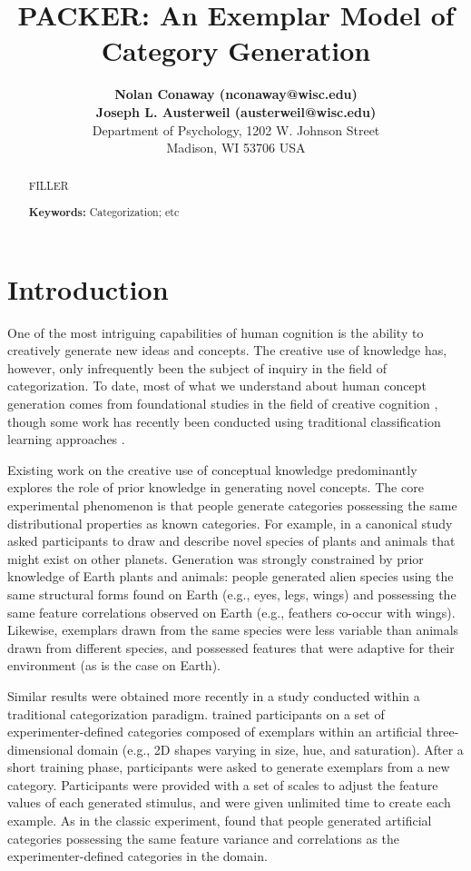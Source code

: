 \documentclass[10pt,letterpaper]{article}
\title{PACKER: An Exemplar Model of Category Generation}
\author{
{ \large \bf Nolan Conaway (nconaway@wisc.edu) } \\
{ \large \bf Joseph L. Austerweil (austerweil@wisc.edu) } \\
Department of Psychology, 1202 W. Johnson Street \\
Madison, WI 53706 USA
}
\begin{document}
\maketitle

\begin{abstract}
FILLER

\textbf{Keywords:} 
Categorization; etc
\end{abstract}

\section{Introduction}

One of the most intriguing capabilities of human cognition is the ability to creatively generate new ideas and concepts. The creative use of knowledge has, however, only infrequently been the subject of inquiry in the field of categorization. To date, most of what we understand about human concept generation comes from foundational studies in the field of creative cognition \citep[e.g.,][]{marsh1999inadvertent,smith1993constraining,ward2002role,ward1994structured,ward1995s}, though some work has recently been conducted using traditional classification learning approaches \citep{jern2013probabilistic}. 

Existing work on the creative use of conceptual knowledge predominantly explores the role of prior knowledge in generating novel concepts. The core experimental phenomenon is that people generate categories possessing the same distributional properties as known categories. For example, in a canonical study \citet{ward1994structured} asked participants to draw and describe novel species of plants and animals that might exist on other planets. Generation was strongly constrained by prior knowledge of Earth plants and animals: people generated alien species using the same structural forms found on Earth (e.g., eyes, legs, wings) and possessing the same feature correlations observed on Earth (e.g., feathers co-occur with wings). Likewise, exemplars drawn from the same species were less variable than animals drawn from different species, and possessed features that were adaptive for their environment (as is the case on Earth).

Similar results were obtained more recently in a study conducted within a traditional categorization paradigm. \citet{jern2013probabilistic} trained participants on a set of experimenter-defined categories composed of exemplars within an artificial three-dimensional domain (e.g., 2D shapes varying in size, hue, and saturation). After a short training phase, participants were asked to generate exemplars from a new category. Participants were provided with a set of scales to adjust the feature values of each generated stimulus, and were given unlimited time to create each example. As in the classic \cite{ward1994structured} experiment, \citet{jern2013probabilistic} found that people generated artificial categories possessing the same feature variance and correlations as the experimenter-defined categories in the domain.
\end{document}
